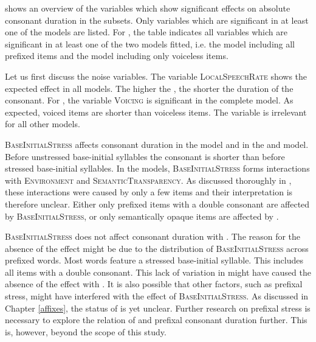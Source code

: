  shows an overview of the variables which show significant effects on absolute consonant duration in the subsets. Only variables which are significant in at least one of the  models are listed. For , the table indicates all variables which are significant in at least one of the two  models fitted, i.e. the model including all prefixed items and the model including only voiceless items.







Let us first discuss the noise variables. The variable \textsc{LocalSpeechRate} shows the expected effect in all models.  The higher the , the shorter the duration of the consonant. 
For , the variable \textsc{Voicing} is significant in the complete model. As expected, voiced items are shorter than voiceless items. The variable is irrelevant for all other models.

\textsc{BaseInitialStress} affects consonant duration in the model and in the  and  model. Before unstressed base-initial syllables the consonant is shorter than before stressed base-initial syllables. 
In the models, \textsc{BaseInitialStress} forms interactions with \textsc{Environment} and \textsc{SemanticTransparency}. As discussed thoroughly in , these interactions were caused by only a few items and their interpretation is therefore unclear. Either only prefixed items with a double consonant are affected by \textsc{BaseInitialStress}, or only semantically opaque items are affected by .

 \textsc{BaseInitialStress} does not affect consonant duration with . The reason for the absence of the effect might be due to the distribution of \textsc{BaseInitialStress} across prefixed words. Most words feature a stressed base-initial syllable. This includes all items with a double consonant. This lack of variation in  might have caused the absence of the effect with . It is also possible that other factors, such as prefixal stress, might have interfered with the effect of \textsc{BaseInitialStress}. As discussed in Chapter \ref{affixes}, the  status of  is yet unclear. Further research on prefixal stress is necessary to explore the relation of  and prefixal consonant duration further. This is, however, beyond the scope of this study.

